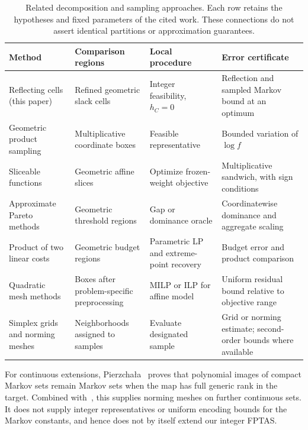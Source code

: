 \documentclass[11pt]{article}
\theoremstyle{definition}\newtheorem{definition}{Definition}[section]
\theoremstyle{remark}\newtheorem{remark}[theorem]{Remark}
\begin{document}
\begin{table}[tbp]
\centering\small
\renewcommand{\arraystretch}{1.18}
\begin{tabular}{@{}p{}p{}p{}p{}@{}}
\toprule
Method & Comparison regions & Local procedure & Error certificate\\
\midrule
Reflecting cells (this paper) & Refined geometric slack cells & Integer feasibility, $h_C=0$ & Reflection and sampled Markov bound at an optimum\\
Geometric product sampling & Multiplicative coordinate boxes & Feasible representative & Bounded variation of $\log f$\\
Sliceable functions~\cite{HWZ} & Geometric affine slices & Optimize frozen-weight objective & Multiplicative sandwich, with sign conditions\\
Approximate Pareto methods~\cite{PY,MSlowrank,MScombined} & Geometric threshold regions & Gap or dominance oracle & Coordinatewise dominance and aggregate scaling\\
Product of two linear costs~\cite{GGR} & Geometric budget regions & Parametric LP and extreme-point recovery & Budget error and product comparison\\
Quadratic mesh methods~\cite{DelPia,DelPiaSubdet} & Boxes after problem-specific preprocessing & MILP or ILP for affine model & Uniform residual bound relative to objective range\\
Simplex grids and norming meshes~\cite{DKLP,DKLSV,PV} & Neighborhoods assigned to samples & Evaluate designated sample & Grid or norming estimate; second-order bounds where available\\
\bottomrule
\end{tabular}
\caption{Related decomposition and sampling approaches. Each row retains the hypotheses and fixed parameters of the cited work. These connections do not assert identical partitions or approximation guarantees.}
\label{tab:framework}
\end{table}

For continuous extensions, Pierzcha\l a~\cite[Theorem~1.4]{Pierzchala} proves that polynomial images of compact Markov sets remain Markov sets when the map has full generic rank in the target. Combined with~\cite[Proposition~2]{PV}, this supplies norming meshes on further continuous sets. It does not supply integer representatives or uniform encoding bounds for the Markov constants, and hence does not by itself extend our integer FPTAS.
\end{document}
